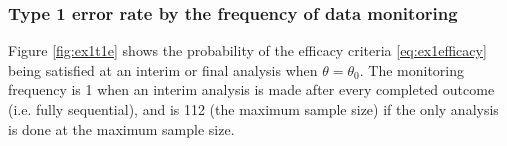 \documentclass[12pt]{article}
\begin{document}

\subsubsection{Type 1 error rate by the frequency of data monitoring}
Figure \ref{fig:ex1t1e} shows the probability of the efficacy criteria \eqref{eq:ex1efficacy} being satisfied at an interim or final analysis when $\theta=\theta_0$. The monitoring frequency is 1 when an interim analysis is made after every completed outcome (i.e. fully sequential), and is 112 (the maximum sample size) if the only analysis is done at the maximum sample size. 
\end{document}
